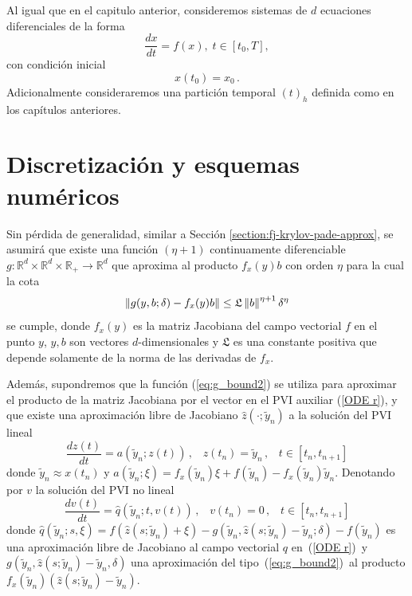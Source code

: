 Al igual que en el capitulo anterior, consideremos sistemas de $d$ ecuaciones diferenciales de la forma
\begin{equation}\label{syst-chap-fj}
	\frac{dx}{dt}=f(x), \; t\in[t_0,T],\end{equation}
con condición inicial
\begin{equation}\label{systcond-chap-fj}
	x(t_0)=x_0\,.
\end{equation}
Adicionalmente consideraremos una partición temporal $(t)_h$ definida como en los capítulos anteriores.

\section{Discretización y esquemas numéricos}

Sin pérdida de generalidad, similar a Sección \ref{section:fj-krylov-pade-approx}, se asumirá que existe una función $(\eta+1)$ continuamente diferenciable $g: \mathbb{R}^{d}\times \mathbb{R}^{d} \times \mathbb{R}_+ \to \mathbb{R}^{d}$ que aproxima al producto $f_x(y)b$ con orden $\eta$ para la cual la cota
\begin{equation} \label{eq:g_bound2}
	\left\lVert g(y,b;\delta)-f_x(y)b \right\rVert \leq \mathfrak{L}\left\lVert b \right\rVert^{\eta+1}\delta^{\eta}
\end{equation}
se cumple, donde $f_x(y)$ es la matriz Jacobiana del campo vectorial $f$ en el punto $y$, $y,b$ son vectores $d$-dimensionales y $\mathfrak{L}$ es una constante positiva que depende solamente de la norma de las derivadas de $f_x$.

Además, supondremos que la función (\ref{eq:g_bound2}) se utiliza para aproximar el producto de la matriz Jacobiana por el vector en el PVI auxiliar (\ref{ODE r}), y que existe una aproximación libre de Jacobiano $\widehat{z}(\cdotp ;\widetilde{y}_n)$ a la solución del PVI lineal
\begin{equation}
    \frac{dz(t)}{dt} = a(\widetilde{y}_n;z(t)) \,,\;\;\; z(t_n)=\widetilde{y}_n \,,\;\;\; t\in[t_n,t_{n+1}]\label{fjsyst0}
\end{equation}
donde $\widetilde{y}_n\approx x(t_n)$ y $a(\widetilde{y}_n;\xi) = f_x(\widetilde{y}_n)\xi+f(\widetilde{y}_n)-f_x(\widetilde{y}_n)\widetilde{y}_n$. Denotando por $v$ la solución del PVI no lineal
\begin{equation}
    \frac{dv(t)}{dt} = \widehat{q}(\widetilde{y}_n;t,v(t)) \,,\;\;\; v(t_n)=0 \,,\;\;\; t\in[t_n,t_{n+1}] \label{fjsyst}
\end{equation}
donde $\widehat{q}(\widetilde{y}_n;s,\xi)=f(\widehat{z}(s;\widetilde{y}_n)+\xi)-g(\widetilde{y}_n,\widehat{z}(s;\widetilde{y}_n)-\widetilde{y}_n;\delta)-f(\widetilde{y}_n)$ es una aproximación libre de Jacobiano al campo vectorial $q$ en~(\ref{ODE r})~y $g(\widetilde{y}_n,\widehat{z}(s;\widetilde{y}_n)-\widetilde{y}_n,\delta)$ una aproximación del tipo~(\ref{eq:g_bound2})~al producto $f_x(\widetilde{y}_n)(\widehat{z}(s;\widetilde{y}_n)-\widetilde{y}_n)$.

